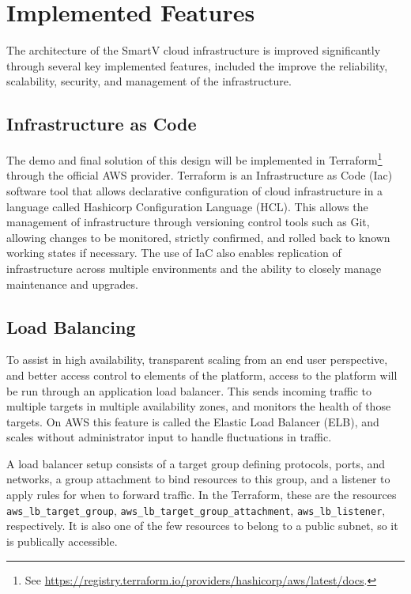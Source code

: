 \section{Implemented Features}\label{sec:implementedfeatures}

The architecture of the SmartV cloud infrastructure is improved significantly through several key implemented features, included the improve the reliability, scalability, security, and management of the infrastructure.

\subsection{Infrastructure as Code}

The demo and final solution of this design will be implemented in Terraform\footnote{See \url{https://registry.terraform.io/providers/hashicorp/aws/latest/docs}.} through the official AWS provider. Terraform is an Infrastructure as Code (Iac) software tool that allows declarative configuration of cloud infrastructure in a language called Hashicorp Configuration Language (HCL). This allows the management of infrastructure through versioning control tools such as Git, allowing changes to be monitored, strictly confirmed, and rolled back to known working states if necessary. The use of IaC also enables replication of infrastructure across multiple environments and the ability to closely manage maintenance and upgrades.

\subsection{Load Balancing}

To assist in high availability, transparent scaling from an end user perspective, and better access control to elements of the platform, access to the platform will be run through an application load balancer. This sends incoming traffic to multiple targets in multiple availability zones, and monitors the health of those targets. On AWS this feature is called the Elastic Load Balancer (ELB), and scales without administrator input to handle fluctuations in traffic.

A load balancer setup consists of a target group defining protocols, ports, and networks, a group attachment to bind resources to this group, and a listener to apply rules for when to forward traffic. In the Terraform, these are the resources \texttt{aws\_lb\_target\_group}, \texttt{aws\_lb\_target\_group\_attachment}, \texttt{aws\_lb\_listener}, respectively. It is also one of the few resources to belong to a public subnet, so it is publically accessible.

